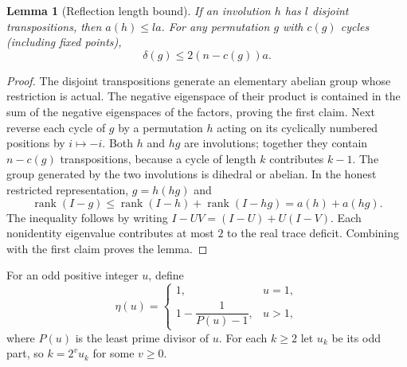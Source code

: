 \documentclass[11pt]{article}
\newtheorem{lemma}[theorem]{Lemma}
\theoremstyle{remark}\newtheorem{remark}[theorem]{Remark}
\begin{document}
\begin{lemma}[Reflection length bound]\label{lem:reflection}
If an involution $h$ has $l$ disjoint transpositions, then $a(h)\le la$. For any permutation $g$ with $c(g)$ cycles (including fixed points),
\[
 \delta(g)\le2(n-c(g))a.
\]
\end{lemma}
\begin{proof}
The disjoint transpositions generate an elementary abelian group whose restriction is actual. The negative eigenspace of their product is contained in the sum of the negative eigenspaces of the factors, proving the first claim. Next reverse each cycle of $g$ by a permutation $h$ acting on its cyclically numbered positions by $i\mapsto-i$. Both $h$ and $hg$ are involutions; together they contain $n-c(g)$ transpositions, because a cycle of length $k$ contributes $k-1$. The group generated by the two involutions is dihedral or abelian. In the honest restricted representation, $g=h(hg)$ and
\[
 \operatorname{rank}(I-g)\le\operatorname{rank}(I-h)+\operatorname{rank}(I-hg)=a(h)+a(hg).
\]
The inequality follows by writing $I-UV=(I-U)+U(I-V)$. Each nonidentity eigenvalue contributes at most $2$ to the real trace deficit. Combining with the first claim proves the lemma.
\end{proof}

For an odd positive integer $u$, define
\begin{equation}\label{eq:eta}
 \eta(u)=\begin{cases}1,&u=1,\\1-\dfrac1{P(u)-1},&u>1,\end{cases}
\end{equation}
where $P(u)$ is the least prime divisor of $u$. For each $k\ge2$ let $u_k$ be its odd part, so $k=2^v u_k$ for some $v\ge0$.
\end{document}

